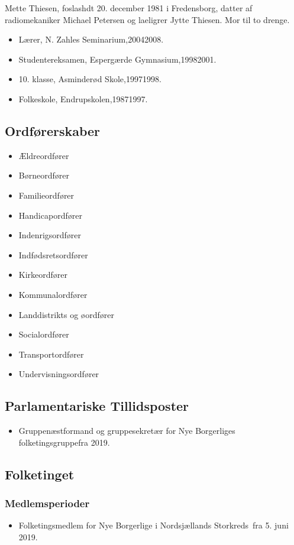 \documentclass[11pt, a4paper]{awesome-cv}
\begin{document}
\makecvheader[R]
\makelettertitle
\begin{cvletter}
Mette Thiesen, foslashdt 20. december 1981 i Fredensborg, datter af radiomekaniker Michael Petersen og laeligrer Jytte Thiesen. Mor til to drenge.

\begin{itemize}
\item Lærer, N. Zahles Seminarium,20042008.
\item Studentereksamen, Espergærde Gymnasium,19982001.
\item 10. klasse, Asminderød Skole,19971998.
\item Folkeskole, Endrupskolen,19871997.
\end{itemize}
\subsection*{Ordførerskaber}
\begin{itemize}
\item Ældreordfører
\item Børneordfører
\item Familieordfører
\item Handicapordfører
\item Indenrigsordfører
\item Indfødsretsordfører
\item Kirkeordfører
\item Kommunalordfører
\item Landdistrikts og øordfører
\item Socialordfører
\item Transportordfører
\item Undervisningsordfører
\end{itemize}
\subsection*{Parlamentariske Tillidsposter}
\begin{itemize}
\item Gruppenæstformand og gruppesekretær for Nye Borgerliges folketingsgruppefra 2019.
\end{itemize}
\subsection*{Folketinget}
\subsubsection*{Medlemsperioder}
\begin{itemize}
\item Folketingsmedlem for Nye Borgerlige i Nordsjællands Storkreds fra 5. juni 2019.
\end{itemize}

\end{cvletter}
\end{document}
